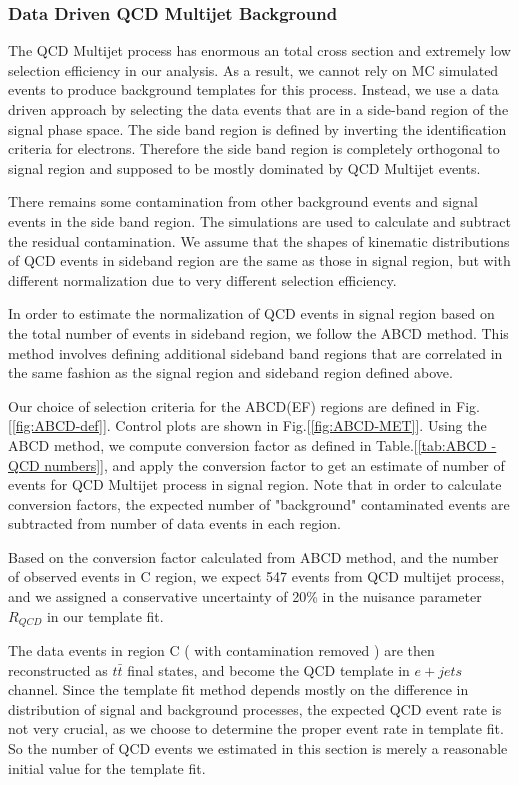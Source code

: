 \subsubsection* {Data Driven QCD Multijet Background}
\label{sec:data driven qcd}

The QCD Multijet process has enormous an total cross section and extremely low selection efficiency in our analysis. As a result, we cannot rely on MC simulated events to produce background templates for this process. Instead, we use a data driven approach by selecting the data events that are in a side-band region of the signal phase space. The side band region is defined by inverting the identification criteria for electrons. Therefore the side band region is completely orthogonal to signal region and supposed to be mostly dominated by QCD Multijet events. 

There remains some contamination from other background events and signal events in the side band region.  The simulations are used to calculate and subtract the residual contamination.  We assume that the shapes of kinematic distributions of QCD events in sideband region are the same as those in signal region, but with different normalization due to very different selection efficiency. 

In order to estimate the normalization of QCD events in signal region based on the total number of events in sideband region, we follow the ABCD method. This method involves defining additional sideband band regions that are correlated in the same fashion as the signal region and sideband region defined above. 

Our choice of selection criteria for the ABCD(EF) regions are defined in Fig.[\ref{fig:ABCD-def}].  Control plots are shown in Fig.[\ref{fig:ABCD-MET}]. Using the ABCD method, we compute conversion factor as defined in Table.[\ref{tab:ABCD - QCD numbers}], and apply the conversion factor to get an estimate of number of events for QCD Multijet process in signal region. Note that in order to calculate conversion factors, the expected number of "background" contaminated events are subtracted from number of data events in each region. 

Based on the conversion factor calculated from ABCD method, and the number of observed events in C region, we expect 547 events from QCD multijet process, and we assigned a conservative uncertainty of 20\% in the nuisance parameter $R_{QCD}$ in our template fit. 

The data events in region C ( with contamination removed ) are then reconstructed as $t\bar{t}$ final states, and become the QCD template in $e+jets$ channel. Since the template fit method depends mostly on the difference in distribution of signal and background processes, the expected QCD event rate is not very crucial, as we choose to determine the proper event rate in template fit. So the number of QCD events we estimated in this section is merely a reasonable initial value for the template fit. 

